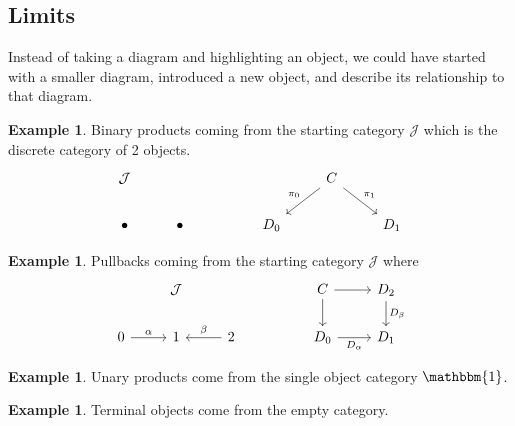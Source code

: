 \documentclass[11pt]{article} %
\theoremstyle{definition}
\theoremstyle{definition}
\theoremstyle{definition}
\newtheorem{example/}[theorem]{Example}
\newenvironment{example}
  {\renewcommand{\qedsymbol}{$\blacktriangle$}%
   \pushQED{\qed}\begin{example/}}
  {\popQED\end{example/}}
\begin{document}
\subsection{Limits}
Instead of taking a diagram and highlighting an object, we could have started with a smaller diagram,
introduced a new object, and describe its relationship to that diagram.
\begin{example}
Binary products coming from the starting category $\mathcal{J}$ which is the discrete category of 2 objects.
\[\begin{tikzcd}
	{\mathcal{J}} &&&& C \\
	\bullet & \bullet && {D_0} && {D_1}
	\arrow["{\pi_0}"', from=1-5, to=2-4]
	\arrow["{\pi_1}", from=1-5, to=2-6]
\end{tikzcd}\]
\end{example}
\begin{example}
Pullbacks coming from the starting category $\mathcal{J}$ where
\[\begin{tikzcd}
	& {\mathcal{J}} &&& C & {D_2} \\
	0 & 1 & 2 && {D_0} & {D_1}
	\arrow["\alpha", from=2-1, to=2-2]
	\arrow["\beta"', from=2-3, to=2-2]
	\arrow[from=1-5, to=2-5]
	\arrow[from=1-5, to=1-6]
	\arrow["{D_{\beta}}", from=1-6, to=2-6]
	\arrow["{D_{\alpha}}"', from=2-5, to=2-6]
\end{tikzcd}\]
\end{example}
\begin{example}
    Unary products come from the single object category $\mathbbm{1}$.
\end{example}
\begin{example}
    Terminal objects come from the empty category.
\end{example}
\end{document}
